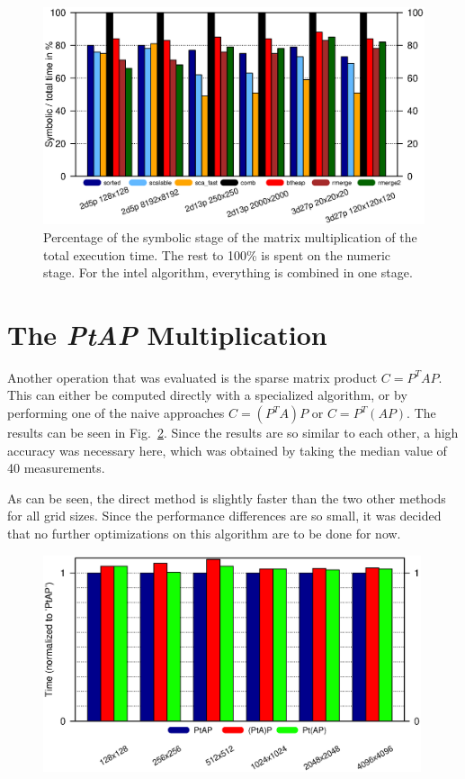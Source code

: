 \begin{figure}[tbp]
	\centering
	\includegraphics[width=1.05\textwidth, trim={0 2.cm 0 6cm},clip]{seq_symnum}
	\caption{Percentage of the symbolic stage of the matrix multiplication of the total execution time. The rest to 100\% is spent on the numeric stage. For the intel algorithm, everything is combined in one stage.} 
	\label{fig:seqsymnum}
\end{figure}


\section{The \textit{PtAP} Multiplication}
Another operation that was evaluated is the sparse matrix product $C = P^T A P$. This can either be computed directly with a specialized algorithm, or by performing one of the naive approaches $C = (P^T A) P$ or $C = P^T (A P)$. The results can be seen in Fig.~\ref{fig:ex2_ptap}. Since the results are so similar to each other, a high accuracy was necessary here, which was obtained by taking the median value of 40 measurements.

As can be seen, the direct method is slightly faster than the two other methods for all grid sizes. 	Since the performance differences are so small, it was decided that no further optimizations on this algorithm are to be done for now.

\begin{figure}[tbp]
	\centering
	\includegraphics[width=0.99\textwidth,  trim={0 2.cm 0 6cm},clip]{ex2_PtAP}
	\caption{} 
	\label{fig:ex2_ptap}
\end{figure}

